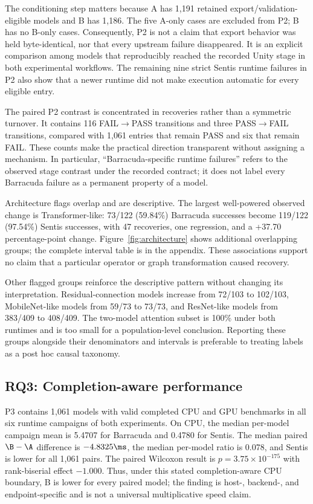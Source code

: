 The conditioning step matters because A has 1,191 retained export/validation-eligible models and B has 1,186. The five A-only cases are excluded from P2; B has no B-only cases. Consequently, P2 is not a claim that export behavior was held byte-identical, nor that every upstream failure disappeared. It is an explicit comparison among models that reproducibly reached the recorded Unity stage in both experimental workflows. The remaining nine strict Sentis runtime failures in P2 also show that a newer runtime did not make execution automatic for every eligible entry.

The paired P2 contrast is concentrated in recoveries rather than a symmetric turnover. It contains 116 FAIL$\rightarrow$PASS transitions and three PASS$\rightarrow$FAIL transitions, compared with 1,061 entries that remain PASS and six that remain FAIL. These counts make the practical direction transparent without assigning a mechanism. In particular, ``Barracuda-specific runtime failures'' refers to the observed stage contrast under the recorded contract; it does not label every Barracuda failure as a permanent property of a model.

Architecture flags overlap and are descriptive. The largest well-powered observed change is Transformer-like: 73/122 (59.84\%) Barracuda successes become 119/122 (97.54\%) Sentis successes, with 47 recoveries, one regression, and a +37.70 percentage-point change. Figure~\ref{fig:architecture} shows additional overlapping groups; the complete interval table is in the appendix. These associations support no claim that a particular operator or graph transformation caused recovery.

Other flagged groups reinforce the descriptive pattern without changing its interpretation. Residual-connection models increase from 72/103 to 102/103, MobileNet-like models from 59/73 to 73/73, and ResNet-like models from 383/409 to 408/409. The two-model attention subset is 100\% under both runtimes and is too small for a population-level conclusion. Reporting these groups alongside their denominators and intervals is preferable to treating labels as a post hoc causal taxonomy.

\ArchitectureFigure

\subsection{RQ3: Completion-aware performance}
P3 contains 1,061 models with valid completed CPU and GPU benchmarks in all six runtime campaigns of both experiments. On CPU, the median per-model campaign mean is 5.4707\ms{} for Barracuda and 0.4780\ms{} for Sentis. The median paired $\B-\A$ difference is $-4.8325\ms$, the median per-model ratio is 0.078, and Sentis is lower for all 1,061 pairs. The paired Wilcoxon result is $p=3.75\times10^{-175}$ with rank-biserial effect $-1.000$. Thus, under this stated completion-aware CPU boundary, B is lower for every paired model; the finding is host-, backend-, and endpoint-specific and is not a universal multiplicative speed claim.

